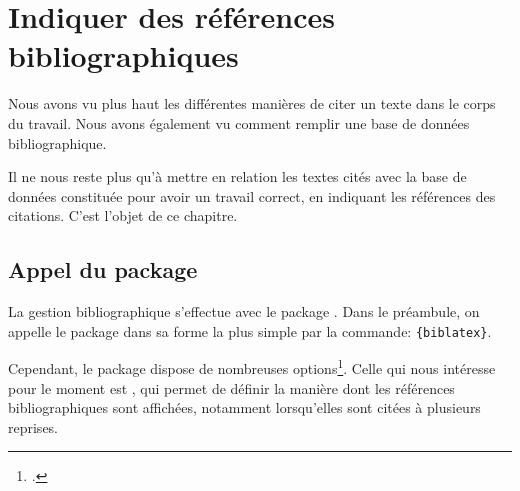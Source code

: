 \chapter{Indiquer des références bibliographiques}

\bibverbose

\begin{intro}
Nous avons vu plus haut les différentes manières de citer un texte dans le corps du travail. Nous avons également vu comment remplir une base de données bibliographique.

Il ne nous reste plus qu'à mettre en relation les textes cités avec la base de données constituée pour avoir un travail correct, en indiquant les références des citations. C'est l'objet de ce chapitre.

\end{intro}


\section[Appel du package]{Appel du package }

La gestion bibliographique s'effectue avec le package . Dans le préambule, on appelle le package dans sa forme la plus simple par la commande:
\verb|{biblatex}|.


Cependant, le package dispose de nombreuses options\footcite{biblatex_options}. Celle qui nous intéresse pour le moment est , qui permet de définir la manière dont les références bibliographiques sont affichées, notamment lorsqu'elles sont citées à plusieurs reprises.

